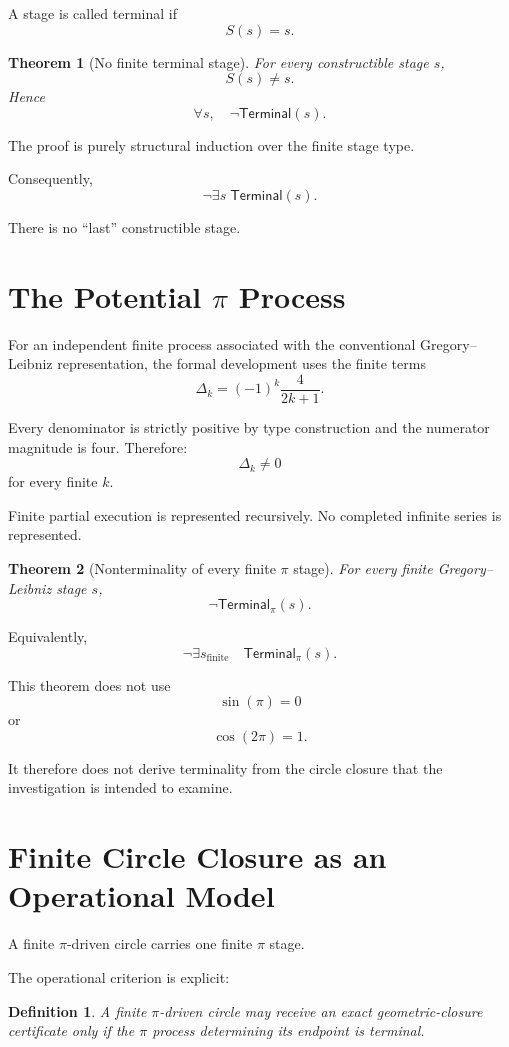 \documentclass[11pt,a4paper]{article}
\newtheorem{theorem}{Theorem}
\newtheorem{definition}{Definition}
\newcommand{\Terminal}{\mathsf{Terminal}}
\begin{document}
A stage is called terminal if
\[
S(s)=s.
\]

\begin{theorem}[No finite terminal stage]
For every constructible stage $s$,
\[
S(s)\neq s.
\]
Hence
\[
\forall s,\quad \neg\Terminal(s).
\]
\end{theorem}

The proof is purely structural induction over the finite stage type.

Consequently,
\[
\neg\exists s\; \Terminal(s).
\]

There is no ``last'' constructible stage.

\section{The Potential \texorpdfstring{$\pi$}{pi} Process}

For an independent finite process associated with the conventional
Gregory--Leibniz representation, the formal development uses the finite
terms
\[
\Delta_k
=
(-1)^k\frac{4}{2k+1}.
\]

Every denominator is strictly positive by type construction and the
numerator magnitude is four. Therefore:
\[
\boxed{\Delta_k\neq0}
\]
for every finite $k$.

Finite partial execution is represented recursively. No completed
infinite series is represented.

\begin{theorem}[Nonterminality of every finite $\pi$ stage]
For every finite Gregory--Leibniz stage $s$,
\[
\neg\Terminal_\pi(s).
\]
\end{theorem}

Equivalently,
\[
\boxed{
\neg\exists s_{\mathrm{finite}}
\quad
\Terminal_\pi(s).
}
\]

This theorem does not use
\[
\sin(\pi)=0
\]
or
\[
\cos(2\pi)=1.
\]

It therefore does not derive terminality from the circle closure that
the investigation is intended to examine.

\section{Finite Circle Closure as an Operational Model}

A finite $\pi$-driven circle carries one finite $\pi$ stage.

The operational criterion is explicit:

\begin{definition}
A finite $\pi$-driven circle may receive an exact geometric-closure
certificate only if the $\pi$ process determining its endpoint is
terminal.
\end{definition}
\end{document}

